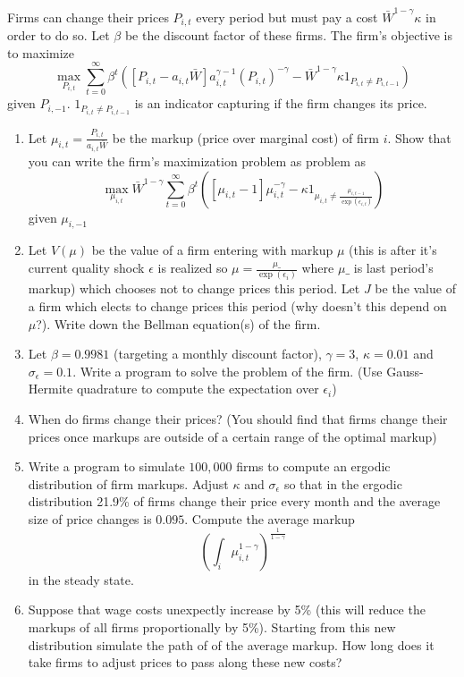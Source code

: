 \documentclass{exam}
\begin{document}
 Firms can change their prices $P_{i,t}$ every period but must pay a cost $\bar W^{1-\gamma}\kappa$ in order to do so.  Let $\beta$ be the discount factor of these firms. The firm's objective is to maximize
 \begin{equation}
 	\max_{P_{i,t}} \sum_{t=0}^\infty \beta^t\left([P_{i,t}-a_{i,t}\bar W]a_{i,t}^{\gamma-1}\left(P_{i,t}\right)^{-\gamma}-\bar W^{1-\gamma}\kappa1_{P_{i,t}\neq P_{i,t-1}}\right)
 \end{equation}given $P_{i,-1}$. $1_{P_{i,t}\neq P_{i,t-1}}$ is an indicator capturing if the firm changes its price.  
 \begin{enumerate}
 	\item Let $\mu_{i,t}=\frac{P_{i,t}}{a_{i,t}\bar W}$ be the markup (price over marginal cost) of firm $i$.  Show that you can write the firm's maximization problem as problem as 
 	\begin{equation}
 		\max_{\mu_{i,t}}\bar W^{1-\gamma}\sum_{t=0}^\infty \beta^t\left([\mu_{i,t}-1]\mu_{i,t}^{-\gamma}-\kappa1_{\mu_{i,t}\neq \frac{\mu_{i,t-1}}{\exp(\epsilon_{i,t})}}\right)
 	\end{equation}given $\mu_{i,-1}$
 	\item  Let $V(\mu)$ be the value of a firm entering with markup $\mu$ (this is after it's current quality shock $\epsilon$ is realized so $\mu=\frac{\mu\_}{\exp(\epsilon_i)}$ where $\mu\_$ is last period's markup) which chooses not to change prices this period.  Let $J$ be the value of a firm which elects to change prices this period (why doesn't this depend on $\mu$?).  Write down the Bellman equation(s) of the firm.
 	\item  Let $\beta=0.9981$ (targeting a monthly discount factor), $\gamma =3$, $\kappa =0.01$ and $\sigma_\epsilon = 0.1$.  Write a program to solve the problem of the firm. (Use Gauss-Hermite quadrature to compute the expectation over $\epsilon_i$)
 	\item  When do firms change their prices? (You should find that firms change their prices once markups are outside of a certain range of the optimal markup)
 	\item  Write a program to simulate $100,000$ firms to compute an ergodic distribution of firm markups.  Adjust $\kappa$ and $\sigma_\epsilon$ so that in the ergodic distribution 21.9\% of firms change their price every month and the average size of price changes is $0.095$. Compute the average markup
 	\begin{equation*}
 		\left(\int_i\mu_{i,t}^{1-\gamma}\right)^\frac1{1-\gamma}
 	\end{equation*}in the steady state.
 	\item  Suppose that wage costs unexpectly increase by 5\% (this will reduce the markups of all firms proportionally by 5\%).  Starting from this new distribution simulate the path of of the average markup.  How long does it take firms to adjust prices to pass along these new costs?
 \end{enumerate}
\end{document}

